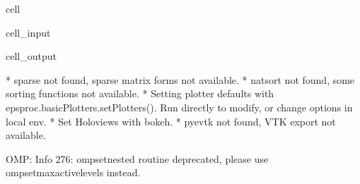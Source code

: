 \documentclass[letterpaper,table,10pt,english]{jupyterBook}
\begin{document}
\begin{sphinxuseclass}{cell}\begin{sphinxVerbatimInput}

\begin{sphinxuseclass}{cell_input}
\begin{sphinxVerbatim}[commandchars=\\\{\}]
 
\PYG{p}{[}   \PYG{p}{]}
\end{sphinxVerbatim}

\end{sphinxuseclass}\end{sphinxVerbatimInput}
\begin{sphinxVerbatimOutput}

\begin{sphinxuseclass}{cell_output}
\begin{sphinxVerbatim}[commandchars=\\\{\}]
* sparse not found, sparse matrix forms not available. 
* natsort not found, some sorting functions not available. 
* Setting plotter defaults with epsproc.basicPlotters.setPlotters(). Run directly to modify, or change options in local env.
* Set Holoviews with bokeh.
* pyevtk not found, VTK export not available. 
\end{sphinxVerbatim}

\begin{sphinxVerbatim}[commandchars=\\\{\}]
OMP: Info \PYGZsh{}276: omp\PYGZus{}set\PYGZus{}nested routine deprecated, please use omp\PYGZus{}set\PYGZus{}max\PYGZus{}active\PYGZus{}levels instead.
\end{sphinxVerbatim}


\end{sphinxuseclass}
\end{sphinxVerbatimOutput}
\end{sphinxuseclass}
\end{document}
